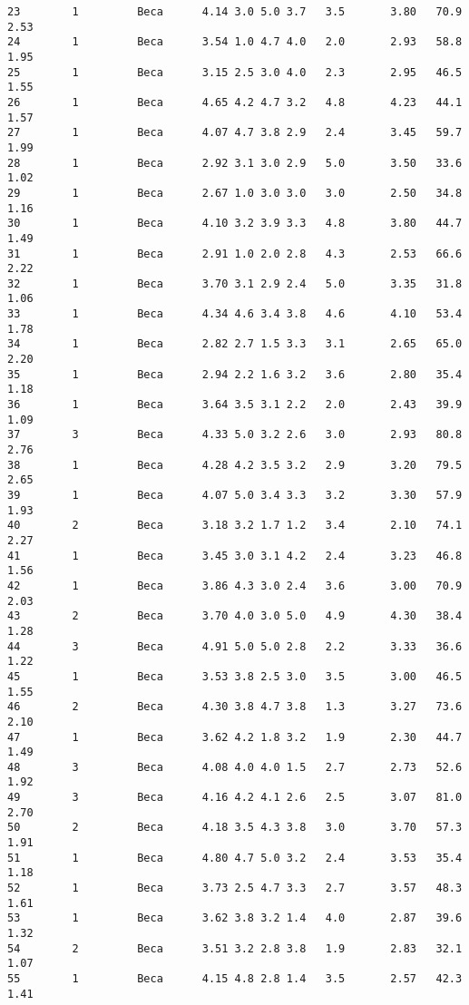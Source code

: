 \documentclass[
  letterpaper,
  DIV=11,
  numbers=noendperiod]{scrartcl}
\begin{document}
\begin{verbatim}
23        1         Beca      4.14 3.0 5.0 3.7   3.5       3.80   70.9    2.53
24        1         Beca      3.54 1.0 4.7 4.0   2.0       2.93   58.8    1.95
25        1         Beca      3.15 2.5 3.0 4.0   2.3       2.95   46.5    1.55
26        1         Beca      4.65 4.2 4.7 3.2   4.8       4.23   44.1    1.57
27        1         Beca      4.07 4.7 3.8 2.9   2.4       3.45   59.7    1.99
28        1         Beca      2.92 3.1 3.0 2.9   5.0       3.50   33.6    1.02
29        1         Beca      2.67 1.0 3.0 3.0   3.0       2.50   34.8    1.16
30        1         Beca      4.10 3.2 3.9 3.3   4.8       3.80   44.7    1.49
31        1         Beca      2.91 1.0 2.0 2.8   4.3       2.53   66.6    2.22
32        1         Beca      3.70 3.1 2.9 2.4   5.0       3.35   31.8    1.06
33        1         Beca      4.34 4.6 3.4 3.8   4.6       4.10   53.4    1.78
34        1         Beca      2.82 2.7 1.5 3.3   3.1       2.65   65.0    2.20
35        1         Beca      2.94 2.2 1.6 3.2   3.6       2.80   35.4    1.18
36        1         Beca      3.64 3.5 3.1 2.2   2.0       2.43   39.9    1.09
37        3         Beca      4.33 5.0 3.2 2.6   3.0       2.93   80.8    2.76
38        1         Beca      4.28 4.2 3.5 3.2   2.9       3.20   79.5    2.65
39        1         Beca      4.07 5.0 3.4 3.3   3.2       3.30   57.9    1.93
40        2         Beca      3.18 3.2 1.7 1.2   3.4       2.10   74.1    2.27
41        1         Beca      3.45 3.0 3.1 4.2   2.4       3.23   46.8    1.56
42        1         Beca      3.86 4.3 3.0 2.4   3.6       3.00   70.9    2.03
43        2         Beca      3.70 4.0 3.0 5.0   4.9       4.30   38.4    1.28
44        3         Beca      4.91 5.0 5.0 2.8   2.2       3.33   36.6    1.22
45        1         Beca      3.53 3.8 2.5 3.0   3.5       3.00   46.5    1.55
46        2         Beca      4.30 3.8 4.7 3.8   1.3       3.27   73.6    2.10
47        1         Beca      3.62 4.2 1.8 3.2   1.9       2.30   44.7    1.49
48        3         Beca      4.08 4.0 4.0 1.5   2.7       2.73   52.6    1.92
49        3         Beca      4.16 4.2 4.1 2.6   2.5       3.07   81.0    2.70
50        2         Beca      4.18 3.5 4.3 3.8   3.0       3.70   57.3    1.91
51        1         Beca      4.80 4.7 5.0 3.2   2.4       3.53   35.4    1.18
52        1         Beca      3.73 2.5 4.7 3.3   2.7       3.57   48.3    1.61
53        1         Beca      3.62 3.8 3.2 1.4   4.0       2.87   39.6    1.32
54        2         Beca      3.51 3.2 2.8 3.8   1.9       2.83   32.1    1.07
55        1         Beca      4.15 4.8 2.8 1.4   3.5       2.57   42.3    1.41

\end{verbatim}
\end{document}
